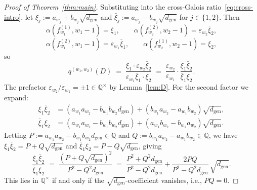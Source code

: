 \documentclass[11pt,a4paper]{amsart}
\theoremstyle{plain}
\theoremstyle{definition}
\newcommand{\Q}{\mathbb{Q}}
\newcommand{\eqdef}{:=}
\newcommand{\fl}[2]{f_{#1}^{(#2)}}
\newcommand{\qstr}[2]{q^{(#1,#2)}}
\newcommand{\dgen}{d_{\mathrm{gen}}}
\begin{document}
\begin{proof}[Proof of Theorem~\ref{thm:main}]
Substituting into the cross-Galois ratio~\eqref{eq:cross-intro}, let
$\xi_j \eqdef a_{w_j} + b_{w_j} \sqrt{\dgen}$ and $\bar\xi_j \eqdef
a_{w_j} - b_{w_j} \sqrt{\dgen}$ for $j \in \{1, 2\}$.  Then
\[
   \alpha(\fl{w_1}{1}, w_1{-}1) = \xi_1,
   \qquad
   \alpha(\fl{w_2}{2}, w_2{-}1) = \varepsilon_{w_2} \bar\xi_2,
\]
\[
   \alpha(\fl{w_1}{2}, w_1{-}1) = \varepsilon_{w_1} \bar\xi_1,
   \qquad
   \alpha(\fl{w_2}{1}, w_2{-}1) = \xi_2,
\]
so
\begin{equation}\label{eq:q-decomp}
   \qstr{w_1}{w_2}(D) \;=\;
   \frac{\xi_1 \cdot \varepsilon_{w_2} \bar\xi_2}
        {\varepsilon_{w_1} \bar\xi_1 \cdot \xi_2}
   \;=\;
   \frac{\varepsilon_{w_2}}{\varepsilon_{w_1}}
   \cdot
   \frac{\xi_1 \bar\xi_2}{\bar\xi_1 \xi_2}.
\end{equation}
The prefactor $\varepsilon_{w_2} / \varepsilon_{w_1} = \pm 1 \in
\Q^\times$ by Lemma~\ref{lem:D}.  For the second factor we
expand:
\begin{align*}
   \xi_1 \bar\xi_2 &= (a_{w_1} a_{w_2} - b_{w_1} b_{w_2} \dgen)
                    + (b_{w_1} a_{w_2} - a_{w_1} b_{w_2}) \sqrt{\dgen},\\
   \bar\xi_1 \xi_2 &= (a_{w_1} a_{w_2} - b_{w_1} b_{w_2} \dgen)
                    + (a_{w_1} b_{w_2} - b_{w_1} a_{w_2}) \sqrt{\dgen}.
\end{align*}
Letting
$P \eqdef a_{w_1} a_{w_2} - b_{w_1} b_{w_2} \dgen \in \Q$ and
$Q \eqdef b_{w_1} a_{w_2} - a_{w_1} b_{w_2} \in \Q$, we have
$\xi_1 \bar\xi_2 = P + Q\sqrt{\dgen}$ and $\bar\xi_1 \xi_2 = P -
Q\sqrt{\dgen}$, giving
\begin{equation}\label{eq:q-rationalisation}
   \frac{\xi_1 \bar\xi_2}{\bar\xi_1 \xi_2}
   \;=\;
   \frac{(P + Q\sqrt{\dgen})^2}{P^2 - Q^2 \dgen}
   \;=\;
   \frac{P^2 + Q^2 \dgen}{P^2 - Q^2 \dgen}
   + \frac{2 P Q}{P^2 - Q^2 \dgen}\,\sqrt{\dgen}.
\end{equation}
This lies in $\Q^\times$ if and only if the $\sqrt{\dgen}$-coefficient
vanishes, i.e., $P Q = 0$.


\end{proof}
\end{document}
